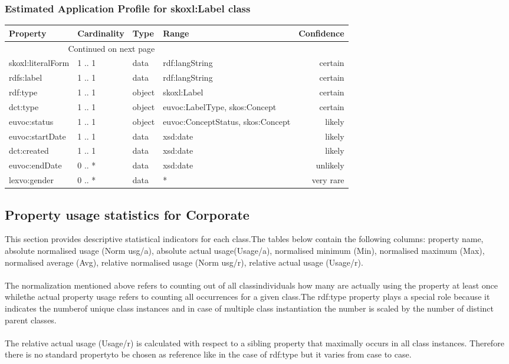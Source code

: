 \documentclass[10pt,a4paper,titlepage,final]{article}
\begin{document}
\subsubsection{Estimated Application Profile for skoxl:Label class}
\begin{tabularx}{\textwidth}{lllXr}
\toprule
          Property & Cardinality &    Type &                              Range & Confidence \\
\midrule
\endhead
\midrule
\multicolumn{3}{r}{{Continued on next page}} \\
\midrule
\endfoot

\bottomrule
\endlastfoot
 skoxl:literalForm &      1 .. 1 &    data &                     rdf:langString &    certain \\
        rdfs:label &      1 .. 1 &    data &                     rdf:langString &    certain \\
          rdf:type &      1 .. 1 &  object &                        skoxl:Label &    certain \\
          dct:type &      1 .. 1 &  object &      euvoc:LabelType, skos:Concept &    certain \\
      euvoc:status &      1 .. 1 &  object &  euvoc:ConceptStatus, skos:Concept &     likely \\
   euvoc:startDate &      1 .. 1 &    data &                           xsd:date &     likely \\
       dct:created &      1 .. 1 &    data &                           xsd:date &     likely \\
     euvoc:endDate &      0 .. * &    data &                           xsd:date &   unlikely \\
      lexvo:gender &      0 .. * &    data &                                  * &  very rare \\
\end{tabularx}


\subsection{Property usage statistics for Corporate}
This section provides descriptive statistical indicators for each class.The tables below contain the following columns: property name, absolute normalised usage (Norm usg/a), absolute actual usage(Usage/a), normalised minimum (Min), normalised maximum (Max), normalised average (Avg), relative normalised usage (Norm usg/r), relative actual usage (Usage/r).\\\\The normalization mentioned above refers to counting out of all classindividuals how many are actually using the property at least once whilethe actual property usage refers to counting all occurrences for a given class.The rdf:type property plays a special role because it indicates the numberof unique class instances and in case of multiple class instantiation the number is scaled by the  number of distinct parent classes. \\\\The relative actual usage (Usage/r) is calculated with respect to a sibling property that maximally occurs in all class instances. Therefore there is no standard propertyto be chosen as reference like in the case of rdf:type but it varies from case to case.
\end{document}
